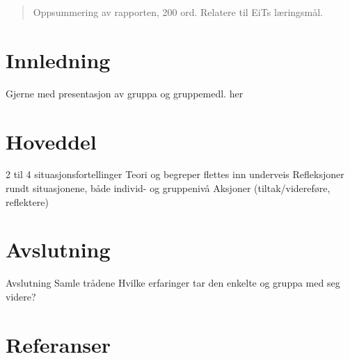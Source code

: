 \documentclass[12pt]{article}
\begin{document}

\tableofcontents

\newpage

\begin{abstract}
Oppsummering av rapporten, 200 ord. Relatere til EiTs læringsmål.
\end{abstract}

\section{Innledning}
Gjerne med presentasjon av gruppa og gruppemedl. her
\section{Hoveddel}
2 til 4 situasjonsfortellinger
Teori og begreper flettes inn underveis
Refleksjoner rundt situasjonene, både individ- og gruppenivå
Aksjoner (tiltak/videreføre, reflektere)
\section{Avslutning}
Avslutning
Samle trådene
Hvilke erfaringer tar den enkelte og gruppa med seg videre?

\section{Referanser}
\end{document}
